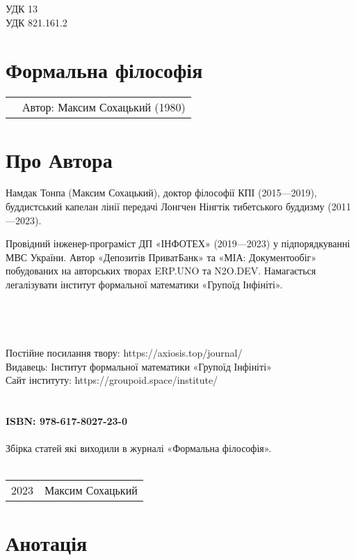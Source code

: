\noindent УДК 13\\
УДК 821.161.2

\section*{Формальна філософія}

\begin{tabular}{ll}
& Автор: Максим Сохацький (1980)\\
\end{tabular}

\section*{Про Автора}
Намдак Тонпа (Максим Сохацький), доктор філософії КПІ (2015---2019),
буддистський капелан лінії передачі Лонгчен Нінгтік тибетського
буддизму (2011---2023).

Провідний інженер-програміст ДП «ІНФОТЕХ» (2019---2023)
у підпорядкуванні МВС України. Автор «Депозитів ПриватБанк» та «МІА: Документообіг» побудованих
на авторських творах ERP.UNO та N2O.DEV. Намагається легалізувати
інститут формальної математики «Групоїд Інфініті».
\\
\\
\\
\\
\\
Постійне посилання твору: https://axiosis.top/journal/ \\
Видавець: Інститут формальної математики «Групоїд Інфініті» \\
Сайт інституту: https://groupoid.space/institute/ \\
\\
\\
{\bf ISBN: 978-617-8027-23-0 \hspace{2em}}
\\
\\
\small
\indent Збірка статей які виходили в журналі «Формальна філософія».
\\
\\
\begin{tabular}{ll}
\textcopyright{} 2023 & Максим Сохацький
\end{tabular}

\newpage
\section*{Анотація}

\normalsize
